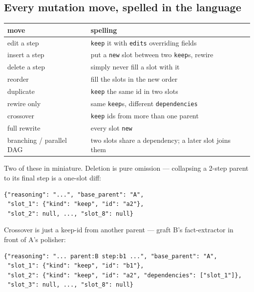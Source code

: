 \documentclass[11pt]{article}
\begin{document}
\subsection{Every mutation move, spelled in the language}
\begin{center}
\small
\begin{tabular}{ll}
\toprule
move & spelling \\
\midrule
edit a step & \texttt{keep} it with \texttt{edits} overriding fields \\
insert a step & put a \texttt{new} slot between two \texttt{keep}s, rewire \\
delete a step & simply never fill a slot with it \\
reorder & fill the slots in the new order \\
duplicate & \texttt{keep} the same id in two slots \\
rewire only & same \texttt{keep}s, different \texttt{dependencies} \\
crossover & \texttt{keep} ids from more than one parent \\
full rewrite & every slot \texttt{new} \\
branching / parallel DAG & two slots share a dependency; a later slot joins them \\
\bottomrule
\end{tabular}
\end{center}
Two of these in miniature. Deletion is pure omission --- collapsing a 2-step parent to its
final step is a one-slot diff:
\begin{lstlisting}
{"reasoning": "...", "base_parent": "A",
 "slot_1": {"kind": "keep", "id": "a2"},
 "slot_2": null, ..., "slot_8": null}
\end{lstlisting}
Crossover is just a keep-id from another parent --- graft B's fact-extractor in front of A's
polisher:
\begin{lstlisting}
{"reasoning": "... parent:B step:b1 ...", "base_parent": "A",
 "slot_1": {"kind": "keep", "id": "b1"},
 "slot_2": {"kind": "keep", "id": "a2", "dependencies": ["slot_1"]},
 "slot_3": null, ..., "slot_8": null}
\end{lstlisting}
\end{document}
